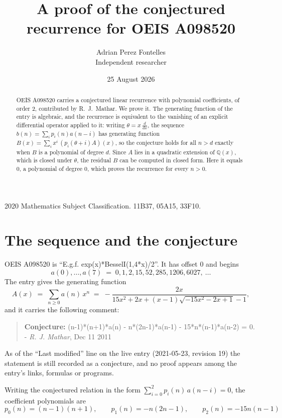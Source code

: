 \documentclass[11pt,a4paper]{article}
\title{A proof of the conjectured recurrence for OEIS A098520}
\author{Adrian Perez Fontelles\\ \small Independent researcher}
\date{25 August 2026}
\theoremstyle{plain}
\theoremstyle{definition}
\begin{document}
\maketitle

\begin{abstract}
OEIS A098520 carries a conjectured linear recurrence with polynomial coefficients, of
order 2, contributed by R.~J.~Mathar. We prove it. The generating function of the
entry is algebraic, and the recurrence is equivalent to the vanishing of an explicit
differential operator applied to it: writing $\theta=x\,\frac{d}{dx}$, the sequence
$b(n)=\sum_{i}p_{i}(n)a(n-i)$ has generating function
$B(x)=\sum_{i}x^{i}\,(p_{i}(\theta+i)A)(x)$, so the conjecture holds for all $n>d$ exactly
when $B$ is a polynomial of degree $d$. Since $A$ lies in a quadratic extension of
$\mathbb{Q}(x)$, which is closed under $\theta$, the residual $B$ can be computed in
closed form. Here it equals $0$, a polynomial of degree $0$, which proves
the recurrence for every $n>0$.
\end{abstract}

\noindent\small 2020 Mathematics Subject Classification. 11B37, 05A15, 33F10.\normalsize

\section{The sequence and the conjecture}

OEIS A098520 is ``E.g.f. exp(x)*BesselI(1,4*x)/2''. It has offset $0$ and begins
\[
a(0),\dots,a(7)\;=\;0, 1, 2, 15, 52, 285, 1206, 6027,\ \dots
\]
The entry gives the generating function
\begin{equation}\label{eq:gf}
A(x)\;=\;\sum_{n\ge 0} a(n)\,x^{n}\;=\;- \frac{2 x}{15 x^{2} + 2 x + \left(x - 1\right) \sqrt{- 15 x^{2} - 2 x + 1} - 1} ,
\end{equation}
and it carries the following comment:
\begin{quote}\small
\textbf{Conjecture:} (n-1)*(n+1)*a(n) - n*(2n-1)*a(n-1) - 15*n*(n-1)*a(n-2) = 0. - \emph{R. J. Mathar}, Dec 11 2011
\end{quote}
As of the ``Last modified'' line on the live entry (2021-05-23, revision 19) the
statement is still recorded as a conjecture, and no proof appears among the entry's links,
formulas or programs.

Writing the conjectured relation in the form $\sum_{i=0}^{2}p_{i}(n)\,a(n-i)=0$,
the coefficient polynomials are
\[
p_{0}(n)=\left(n - 1\right) \left(n + 1\right),\qquad p_{1}(n)=- n \left(2 n - 1\right),\qquad p_{2}(n)=- 15 n \left(n - 1\right)
\]
\end{document}
